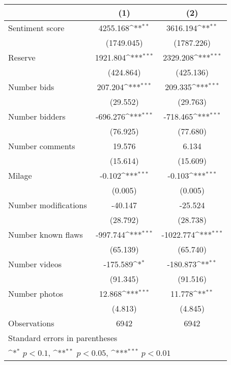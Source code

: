 {
\def\sym#1{\ifmmode^{#1}\else\(^{#1}\)\fi}
\begin{tabular}{l*{2}{c}}
\hline\hline
                    &\multicolumn{1}{c}{(1)}         &\multicolumn{1}{c}{(2)}         \\
\hline
Sentiment score     &    4255.168\sym{**} &    3616.194\sym{**} \\
                    &  (1749.045)         &  (1787.226)         \\
[1em]
Reserve             &    1921.804\sym{***}&    2329.208\sym{***}\\
                    &   (424.864)         &   (425.136)         \\
[1em]
Number bids         &     207.204\sym{***}&     209.335\sym{***}\\
                    &    (29.552)         &    (29.763)         \\
[1em]
Number bidders      &    -696.276\sym{***}&    -718.465\sym{***}\\
                    &    (76.925)         &    (77.680)         \\
[1em]
Number comments     &      19.576         &       6.134         \\
                    &    (15.614)         &    (15.609)         \\
[1em]
Milage              &      -0.102\sym{***}&      -0.103\sym{***}\\
                    &     (0.005)         &     (0.005)         \\
[1em]
Number modifications&     -40.147         &     -25.524         \\
                    &    (28.792)         &    (28.738)         \\
[1em]
Number known flaws  &    -997.744\sym{***}&   -1022.774\sym{***}\\
                    &    (65.139)         &    (65.740)         \\
[1em]
Number videos       &    -175.589\sym{*}  &    -180.873\sym{**} \\
                    &    (91.345)         &    (91.516)         \\
[1em]
Number photos       &      12.868\sym{***}&      11.778\sym{**} \\
                    &     (4.813)         &     (4.845)         \\
\hline
Observations        &        6942         &        6942         \\
\hline\hline
\multicolumn{3}{l}{\footnotesize Standard errors in parentheses}\\
\multicolumn{3}{l}{\footnotesize \sym{*} \(p<0.1\), \sym{**} \(p<0.05\), \sym{***} \(p<0.01\)}\\
\end{tabular}
}
